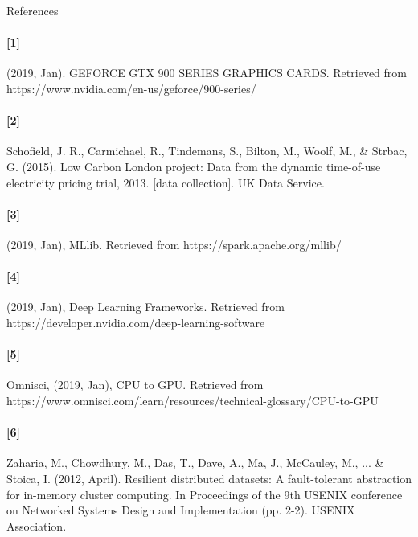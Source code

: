\documentclass[11pt]{article}
\begin{document}
\begin{section}{References}
\paragraph{[1]} (2019, Jan). GEFORCE GTX 900 SERIES GRAPHICS CARDS. Retrieved from https://www.nvidia.com/en-us/geforce/900-series/
\paragraph{[2]} Schofield, J. R., Carmichael, R., Tindemans, S., Bilton, M., Woolf, M., \& Strbac, G. (2015). Low Carbon London project: Data from the dynamic time-of-use electricity pricing trial, 2013. [data collection]. UK Data Service.
\paragraph{[3]} (2019, Jan), MLlib. Retrieved from https://spark.apache.org/mllib/
\paragraph{[4]} (2019, Jan), Deep Learning Frameworks. Retrieved from https://developer.nvidia.com/deep-learning-software
\paragraph{[5]} Omnisci, (2019, Jan), CPU to GPU. Retrieved from https://www.omnisci.com/learn/resources/technical-glossary/CPU-to-GPU
\paragraph{[6]} Zaharia, M., Chowdhury, M., Das, T., Dave, A., Ma, J., McCauley, M., ... \& Stoica, I. (2012, April). Resilient distributed datasets: A fault-tolerant abstraction for in-memory cluster computing. In Proceedings of the 9th USENIX conference on Networked Systems Design and Implementation (pp. 2-2). USENIX Association.
\end{section}
\\
\end{document}
